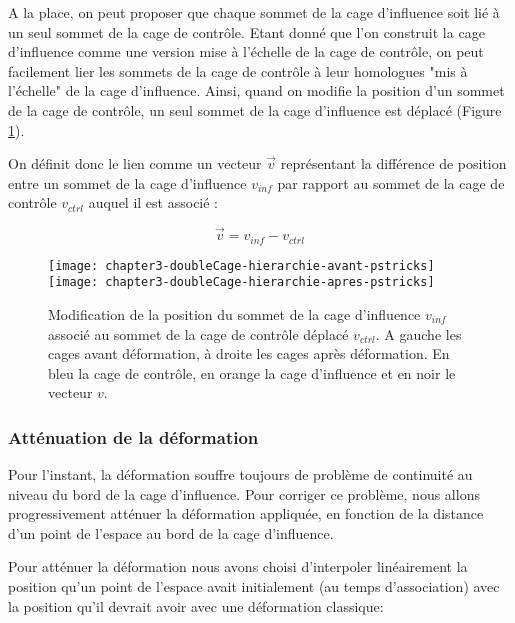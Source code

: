 A la place, on peut proposer que chaque sommet de la cage d'influence soit lié à
un seul sommet de la cage de contrôle. Etant donné que l'on construit la cage
d'influence comme une version mise à l'échelle de la cage de contrôle, on peut
facilement lier les sommets de la cage de contrôle à leur homologues "mis à
l'échelle" de la cage d'influence. Ainsi, quand on modifie la position d'un
sommet de la cage de contrôle, un seul sommet de la cage d'influence est
déplacé (Figure \ref{MelHie}).

On définit donc le lien comme un vecteur $\overrightarrow{v}$ représentant la
différence de position entre un sommet de la cage d'influence $v_{inf}$ par
rapport au sommet de la cage de contrôle $v_{ctrl}$ auquel il est associé :

\begin{displaymath}
  \overrightarrow{v} = v_{inf}-v_{ctrl}
\end{displaymath}

\begin{figure}[ht]
\begin{center}
  \texttt{[image: chapter3-doubleCage-hierarchie-avant-pstricks]}
  \texttt{[image: chapter3-doubleCage-hierarchie-apres-pstricks]}

  \caption[Association des cages de contrôle et d'influence] {Modification de
la position du sommet de la cage d'influence $v_{inf}$ associé au sommet de la
cage de contrôle déplacé $v_{ctrl}$. A gauche les cages avant déformation, à
droite les cages après déformation. En bleu la cage de contrôle, en orange la
cage d'influence et en noir le vecteur $v$.}

  \label{MelHie}
\end{center}
\end{figure}

\subsubsection{Atténuation de la déformation}

Pour l'instant, la déformation souffre toujours de problème de continuité au
niveau du bord de la cage d'influence. Pour corriger ce problème, nous allons
progressivement atténuer la déformation appliquée, en fonction de la distance
d'un point de l'espace au bord de la cage d'influence.

Pour atténuer la déformation nous avons choisi d'interpoler linéairement la
position qu'un point de l'espace avait initialement (au temps d'association)
avec la position qu'il devrait avoir avec une déformation classique:

